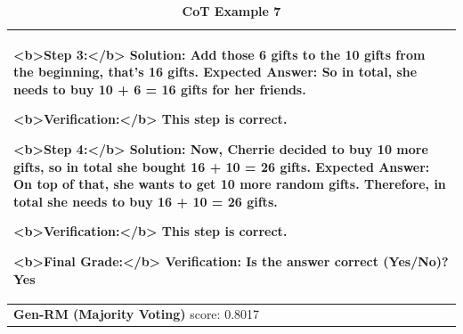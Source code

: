 \begin{table}[ht]
\begin{tabular}{ |p{16.4cm}| }
{<b>Step 3:</b>\newline
Solution: Add those 6 gifts to the 10 gifts from the beginning, that's 16 gifts.\newline
Expected Answer: So in total, she needs to buy 10 + 6 = 16 gifts for her friends.\newline

<b>Verification:</b> {\color{blue}This step is correct}.\newline

<b>Step 4:</b>\newline
Solution: Now, Cherrie decided to buy 10 more gifts, so in total she bought 16 + 10 = 26 gifts.\newline
Expected Answer: On top of that, she wants to get 10 more random gifts. Therefore, in total she needs to buy 16 + 10 = 26 gifts.\newline

<b>Verification:</b> {\color{blue}This step is correct}.\newline

<b>Final Grade:</b>\newline
Verification: {\color{blue}Is the answer correct (Yes/No)? Yes}
\newline
} \\
\midrule
{\textbf{Gen-RM (Majority Voting)} score: {\color{blue}0.8017}}
\newline \\
\midrule
\end{tabular}
\caption{
\textbf{{\genV} CoT Example 7}}
\label{cot-verifier-example-6-full-text}
\end{table}



